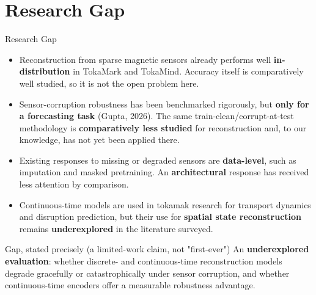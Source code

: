 \documentclass[aspectratio=169]{beamer}
\begin{document}
\section{Research Gap}
\begin{frame}{Research Gap}
  \small
  \begin{itemize}
    \item Reconstruction from sparse magnetic sensors already performs well
      \textbf{in-distribution} in TokaMark and TokaMind. Accuracy itself is
      comparatively well studied, so it is not the open problem here.
    \item Sensor-corruption robustness has been benchmarked rigorously, but
      \textbf{only for a forecasting task} (Gupta, 2026). The same
      train-clean/corrupt-at-test methodology is \textbf{comparatively less
      studied} for reconstruction and, to our knowledge, has not yet been
      applied there.
    \item Existing responses to missing or degraded sensors are
      \textbf{data-level}, such as imputation and masked pretraining. An
      \textbf{architectural} response has received less attention by
      comparison.
    \item Continuous-time models are used in tokamak research for transport
      dynamics and disruption prediction, but their use for \textbf{spatial
      state reconstruction} remains \textbf{underexplored} in the literature
      surveyed.
  \end{itemize}
  \vspace{6pt}
  \begin{block}{Gap, stated precisely (a limited-work claim, not "first-ever")}
    \small An \textbf{underexplored evaluation}: whether discrete- and
    continuous-time reconstruction models degrade gracefully or
    catastrophically under sensor corruption, and whether continuous-time
    encoders offer a measurable robustness advantage.
  \end{block}
\end{frame}

\end{document}
